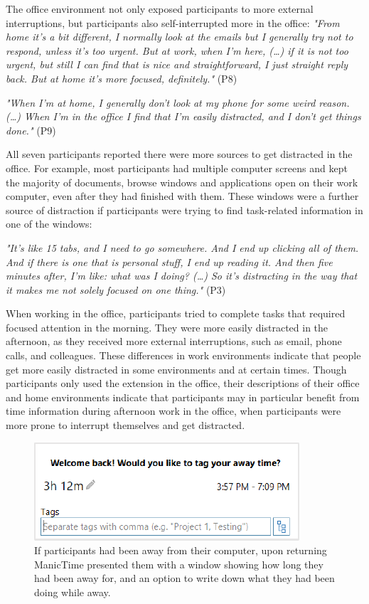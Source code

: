 The office environment not only exposed participants to more external interruptions, but participants also self-interrupted more in the office:
\textit{"From home it’s a bit different, I normally look at the emails but I generally try not to respond, unless it’s too urgent. But at work, when I’m here, (…) if it is not too urgent, but still I can find that is nice and straightforward, I just straight reply back. But at home it’s more focused, definitely."} (P8)

\textit{"When I’m at home, I generally don’t look at my phone for some weird reason. (…) When I’m in the office I find that I’m easily distracted, and I don’t get things done."} (P9)

All seven participants reported there were more sources to get distracted in the office. For example, most participants had multiple computer screens and kept the majority of documents, browse windows and applications open on their work computer, even after they had finished with them. These windows were a further source of distraction if participants were trying to find task-related information in one of the windows:

\textit{"It’s like 15 tabs, and I need to go somewhere. And I end up clicking all of them. And if there is one that is personal stuff, I end up reading it. And then five minutes after, I’m like: what was I doing? (…) So it’s distracting in the way that it makes me not solely focused on one thing."} (P3)

When working in the office, participants tried to complete tasks that required focused attention in the morning. They were more easily distracted in the afternoon, as they received more external interruptions, such as email, phone calls, and colleagues. These differences in work environments indicate that people get more easily distracted in some environments and at certain times. Though participants only used the extension in the office, their descriptions of their office and home environments indicate that participants may in particular benefit from time information during afternoon work in the office, when participants were more prone to interrupt themselves and get distracted.

\begin{figure}
\centering
\centerline{\includegraphics[scale=1]{images/ch56/ch56_MTaway.pdf}}
\caption{ If participants had been away from their computer, upon returning ManicTime presented them with a window showing how long they had been away for, and an option to write down what they had been doing while away.}
\label{fig:ch56-7_mtaway}
\end{figure}


